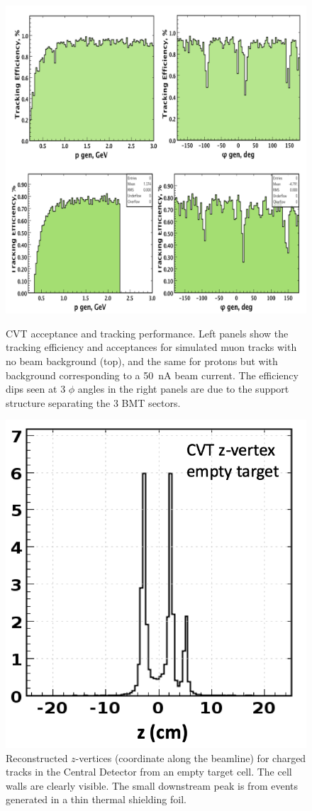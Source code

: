 \documentclass[final,3p,twocolumn]{elsarticle}
\begin{document}
\begin{figure}[t!]
\centerline{\includegraphics[width=1.0\columnwidth]{cvt-acceptance.png}}
\caption{CVT acceptance and tracking performance. Left panels show the tracking efficiency and acceptances
  for simulated muon tracks with no beam background (top), and the same for protons but with background
  corresponding to a 50~nA beam current. The efficiency dips seen at 3 $\phi$ angles in the right panels are due
  to the support structure separating the 3 BMT sectors.}
\label{cvt-acceptance}
\vspace{0.3cm}
\centerline{\includegraphics[width=0.8\columnwidth]{cvt-vertex.png}}
\caption{Reconstructed $z$-vertices (coordinate along the beamline) for charged tracks in the Central Detector
  from an empty target cell. The cell walls are clearly visible. The small downstream peak is from events generated
  in a thin thermal shielding foil.}
\label{cvt-vertex}
\end{figure}
\end{document}
